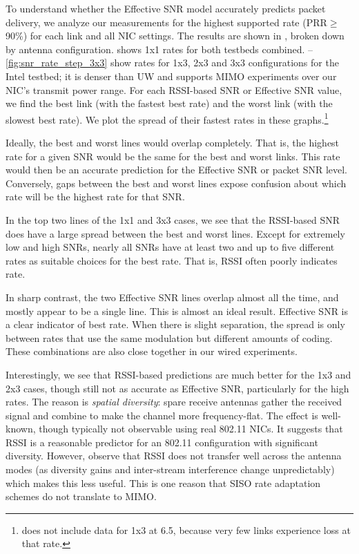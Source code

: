 To understand whether the Effective SNR model accurately predicts packet delivery, we analyze our measurements for the highest supported rate (PRR$\geq$ 90\%) for each link and all NIC settings. The results are shown in , broken down by antenna configuration.  shows 1x1 rates for both testbeds combined. --\ref{fig:snr_rate_step_3x3}  show rates for 1x3, 2x3 and 3x3 configurations for the Intel testbed; it is denser than UW and supports MIMO experiments over our NIC's transmit power range.
For each RSSI-based SNR or Effective SNR value, we find the best link (with the fastest best rate) and the worst link (with the slowest best rate). We plot the spread of their fastest rates in these graphs.\footnote{ does not include data for 1x3 at 6.5\Mbps, because very few links experience loss at that rate.}

Ideally, the best and worst lines would overlap completely. %
That is, the highest rate for a given SNR would be the same for the best and worst links. This rate would then be an accurate prediction for the Effective SNR or packet SNR level. Conversely, gaps between the best and worst lines expose confusion about which rate will be the highest rate for that SNR\@.

In the top two lines of the 1x1 and 3x3 cases, we see that the RSSI-based SNR does have a large spread between the best and worst lines. Except for extremely low and high SNRs, nearly all SNRs have at least two and up to five different rates as suitable choices for the best rate. That is, RSSI often poorly indicates rate.

In sharp contrast, %
the two Effective SNR lines overlap almost all the time, and mostly appear to be a single line. This is almost an ideal result. Effective SNR is a clear indicator of best rate. When there is slight separation, the spread is only between rates that use the same modulation but different amounts of coding. These combinations are also close together in our wired experiments. 

Interestingly, we see that RSSI-based predictions are much better for the 1x3 and 2x3 cases, though still not as accurate as Effective SNR, particularly for the high rates. The reason is \emph{spatial diversity}: spare receive antennas gather the received signal and combine to make the channel more frequency-flat. The effect is well-known, though typically not observable using real 802.11 NICs. It suggests that RSSI is a reasonable predictor for an 802.11 configuration with significant diversity. However, observe that RSSI does not transfer well across the antenna modes (as diversity gains and inter-stream interference change unpredictably) which makes this less useful. This is one reason that SISO rate adaptation schemes do not translate to MIMO\@.

